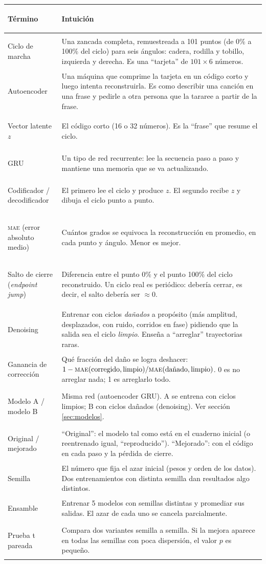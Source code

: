 \documentclass[11pt,a4paper]{article}
\newcommand{\mae}{\textsc{mae}}
\begin{document}
\begin{tabularx}{\textwidth}{>{\bfseries\raggedright\arraybackslash}p{3.1cm}>{\raggedright\arraybackslash}X}
\toprule
Término & Intuición \\
\midrule
Ciclo de marcha & Una zancada completa, remuestreada a 101 puntos (de 0\% a 100\% del ciclo) para seis ángulos: cadera, rodilla y tobillo, izquierda y derecha. Es una ``tarjeta'' de $101\times 6$ números. \\
Autoencoder & Una máquina que comprime la tarjeta en un código corto y luego intenta reconstruirla. Es como describir una canción en una frase y pedirle a otra persona que la tararee a partir de la frase. \\
Vector latente $z$ & El código corto (16 o 32 números). Es la ``frase'' que resume el ciclo. \\
GRU & Un tipo de red recurrente: lee la secuencia paso a paso y mantiene una memoria que se va actualizando. \\
Codificador / decodificador & El primero lee el ciclo y produce $z$. El segundo recibe $z$ y dibuja el ciclo punto a punto. \\
\mae{} (error absoluto medio) & Cuántos grados se equivoca la reconstrucción en promedio, en cada punto y ángulo. Menor es mejor. \\
Salto de cierre (\emph{endpoint jump}) & Diferencia entre el punto 0\% y el punto 100\% del ciclo reconstruido. Un ciclo real es periódico: debería cerrar, es decir, el salto debería ser $\approx 0$. \\
Denoising & Entrenar con ciclos \emph{dañados} a propósito (más amplitud, desplazados, con ruido, corridos en fase) pidiendo que la salida sea el ciclo \emph{limpio}. Enseña a ``arreglar'' trayectorias raras. \\
Ganancia de corrección & Qué fracción del daño se logra deshacer: $1-\mae(\text{corregido},\text{limpio})/\mae(\text{dañado},\text{limpio})$. 0 es no arreglar nada; 1 es arreglarlo todo. \\
Modelo A / modelo B & Misma red (autoencoder GRU). A se entrena con ciclos limpios; B con ciclos dañados (denoising). Ver sección \ref{sec:modelos}. \\
Original / mejorado & ``Original'': el modelo tal como está en el cuaderno inicial (o reentrenado igual, ``reproducido''). ``Mejorado'': con el código en cada paso y la pérdida de cierre. \\
Semilla & El número que fija el azar inicial (pesos y orden de los datos). Dos entrenamientos con distinta semilla dan resultados algo distintos. \\
Ensamble & Entrenar 5 modelos con semillas distintas y promediar sus salidas. El azar de cada uno se cancela parcialmente. \\
Prueba t pareada & Compara dos variantes semilla a semilla. Si la mejora aparece en todas las semillas con poca dispersión, el valor $p$ es pequeño. \\
\bottomrule
\end{tabularx}
\end{document}
